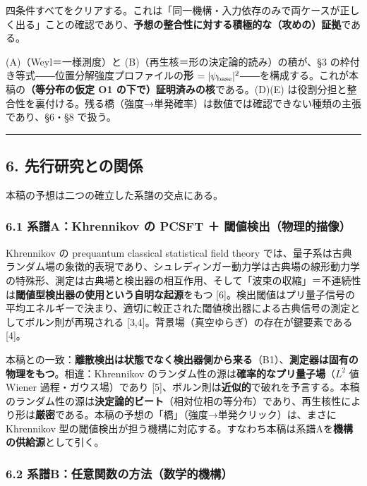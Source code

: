 \documentclass[
]{ltjsarticle}
\begin{document}
四条件すべてをクリアする。これは「同一機構・入力依存のみで両ケースが正しく出る」ことの確認であり、\textbf{予想の整合性に対する積極的な（攻めの）証拠}である。

(A)（Weyl＝一様測度）と (B)（再生核＝形の決定論的読み）の積が、§3
の枠付き等式――位置分解強度プロファイルの\textbf{形}
\(=|\psi_{\rm base}|^2\)――を構成する。これが本稿の\textbf{（等分布の仮定
O1 の下で）証明済みの核}である。(D)(E)
は役割分担と整合性を裏付ける。残る橋（強度→単発確率）は数値では確認できない種類の主張であり、§6・§8
で扱う。

\begin{center}\rule{0.5\linewidth}{0.5pt}\end{center}

\subsection{6.
先行研究との関係}\label{ux5148ux884cux7814ux7a76ux3068ux306eux95a2ux4fc2}

本稿の予想は二つの確立した系譜の交点にある。

\subsubsection{6.1 系譜A：Khrennikov の PCSFT ＋
閾値検出（物理的描像）}\label{ux7cfbux8b5cakhrennikov-ux306e-pcsft-ux95beux5024ux691cux51faux7269ux7406ux7684ux63cfux50cf}

Khrennikov の prequantum classical statistical field theory
では、量子系は古典ランダム場の象徴的表現であり、シュレディンガー動力学は古典場の線形動力学の特殊形、測定は古典場と検出器の相互作用、そして「波束の収縮」＝不連続性は\textbf{閾値型検出器の使用という自明な起源}をもつ
{[}6{]}。検出閾値はプリ量子信号の平均エネルギーで決まり、適切に較正された閾値検出器による古典信号の測定としてボルン則が再現される
{[}3,4{]}。背景場（真空ゆらぎ）の存在が鍵要素である {[}4{]}。

本稿との一致：\textbf{離散検出は状態でなく検出器側から来る}（B1）、\textbf{測定器は固有の物理をもつ}。相違：Khrennikov
のランダム性の源は\textbf{確率的なプリ量子場}（\(L^2\) 値 Wiener
過程・ガウス場）であり
{[}5{]}、ボルン則は\textbf{近似的}で破れを予言する。本稿のランダム性の源は\textbf{決定論的ビート}（相対位相の等分布）であり、再生核性により形は\textbf{厳密}である。本稿の予想の「橋」（強度→単発クリック）は、まさに
Khrennikov
型の閾値検出が担う機構に対応する。すなわち本稿は系譜Aを\textbf{機構の供給源}として引く。

\subsubsection{6.2
系譜B：任意関数の方法（数学的機構）}\label{ux7cfbux8b5cbux4efbux610fux95a2ux6570ux306eux65b9ux6cd5ux6570ux5b66ux7684ux6a5fux69cb}
\end{document}

